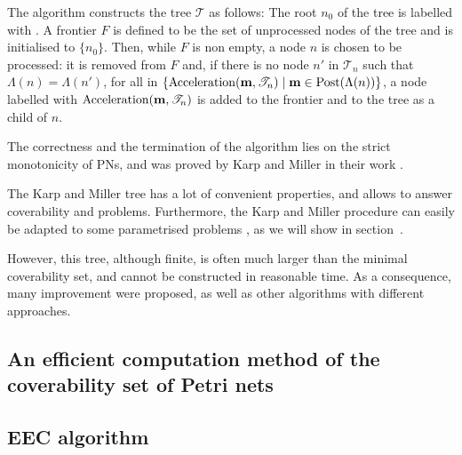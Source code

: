 The algorithm constructs the tree $\mathcal{T}$ as follows:
The root $n_0$ of the tree is labelled with \marqi.
A frontier $F$ is defined to be the set of unprocessed nodes of the tree and is initialised to $\{n_0\}$.
Then, while $F$ is non empty, a node $n$ is chosen to be processed:
it is removed from $F$ and, if there is no node $n'$ in $\mathscr{T}_n$ such that $\Lambda(n) = \Lambda(n')$, for all \omark in $\{\operatorname{Acceleration}(\mathbf{m}, \mathscr{T}_n) \mid \mathbf{m} \in \operatorname{Post}(\Lambda(n))\}$, a node labelled with $\operatorname{Acceleration}(\mathbf{m}, \mathscr{T}_n)$ is added to the frontier and to the tree as a child of $n$.

The correctness and the termination of the algorithm lies on the strict monotonicity of \acp{PN}, and was proved by Karp and Miller in their work \cite{Karp69}.

The Karp and Miller tree has a lot of convenient properties, and allows to answer coverability and \todo{} problems.
Furthermore, the Karp and Miller procedure can easily be adapted to some parametrised problems \cite{David17}, as we will show in section~\todo{}.

However, this tree, although finite, is often much larger than the minimal coverability set, and cannot be constructed in reasonable time.
As a consequence, many improvement were proposed, as well as other algorithms with different approaches.

\subsection{An efficient computation method of the coverability set of Petri nets}
\label{sec:eff}

\citep{Geeraerts07thesis, Geeraerts07}

\subsection{\ac{EEC} algorithm}
\label{sec:eec}

\citep{Geeraerts07thesis, Geeraerts06}

